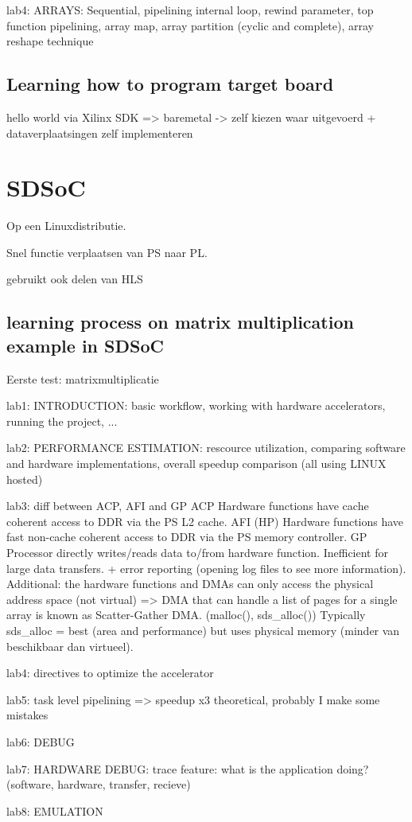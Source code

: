 lab4: ARRAYS: Sequential, pipelining internal loop, rewind parameter, top function pipelining, array map, array partition (cyclic and complete), array reshape technique

\subsection{Learning how to program target board}

hello world via Xilinx SDK => baremetal 
-> zelf kiezen waar uitgevoerd + dataverplaatsingen zelf implementeren


\section{SDSoC}

Op een Linuxdistributie.

Snel functie verplaatsen van PS naar PL.

gebruikt ook delen van HLS

\subsection{learning process on matrix multiplication example in SDSoC}

Eerste test: matrixmultiplicatie

lab1: INTRODUCTION: basic workflow, working with hardware accelerators, running the project, ...

lab2: PERFORMANCE ESTIMATION: rescource utilization, comparing software and hardware implementations, overall speedup comparison (all using LINUX hosted)

lab3: diff between ACP, AFI and GP
	ACP	Hardware functions have cache coherent access to DDR via the PS L2 cache.
	AFI (HP)	Hardware functions have fast non-cache coherent access to DDR via the PS memory controller.
	GP	Processor directly writes/reads data to/from hardware function. Inefficient for large data transfers.
+ error reporting (opening log files to see more information).
Additional: the hardware functions and DMAs can only access the physical address space (not virtual) => DMA that can handle a list of pages for a single array is known as Scatter-Gather DMA. (malloc(), sds\_alloc()) Typically sds\_alloc = best (area and performance) but uses physical memory (minder van beschikbaar dan virtueel).

lab4: directives to optimize the accelerator

lab5: task level pipelining
	=> speedup x3 theoretical, probably I make some mistakes

lab6: DEBUG

lab7: HARDWARE DEBUG: trace feature: what is the application doing? (software, hardware, transfer, recieve)

lab8: EMULATION
